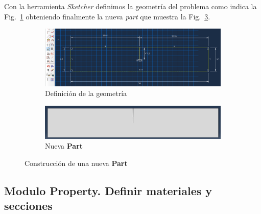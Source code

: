   Con la herramienta \textit{Sketcher} definimos la geometría del
  problema como indica la Fig.~\ref{part03} obteniendo finalmente la nueva
  \textit{part} que muestra la Fig.~\ref{part04}.
  \begin{figure}
    \centering
    \begin{subfigure}[!h]{1.0\textwidth}
      \includegraphics[width=\textwidth]{./body/images/part03}
      \caption{Definición de la geometría}
      \label{part03}
    \end{subfigure}%
    
    \begin{subfigure}[!h]{0.875\textwidth}
      \includegraphics[width=\textwidth]{./body/images/part04}
      \caption{Nueva \textbf{Part}}
      \label{part04}
    \end{subfigure}%
    \caption{Construcción de una nueva \textbf{Part}}
  \end{figure}

  \subsection{Modulo Property. Definir materiales y secciones}

